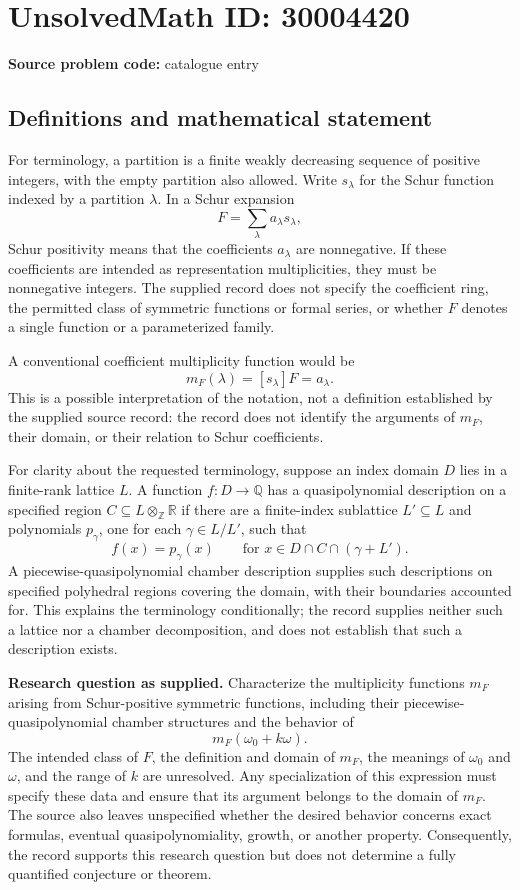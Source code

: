 \documentclass[11pt]{article}
\newcommand{\Z}{\mathbb{Z}}
\newcommand{\Q}{\mathbb{Q}}
\newcommand{\R}{\mathbb{R}}
\begin{document}
\section*{UnsolvedMath ID: 30004420}
\textbf{Source problem code:} catalogue entry
\subsection{Definitions and mathematical statement}
For terminology, a partition is a finite weakly decreasing sequence of positive integers, with the empty partition also allowed. Write \(s_\lambda\) for the Schur function indexed by a partition \(\lambda\). In a Schur expansion
\[
F=\sum_{\lambda}a_\lambda s_\lambda,
\]
Schur positivity means that the coefficients \(a_\lambda\) are nonnegative. If these coefficients are intended as representation multiplicities, they must be nonnegative integers. The supplied record does not specify the coefficient ring, the permitted class of symmetric functions or formal series, or whether \(F\) denotes a single function or a parameterized family.

A conventional coefficient multiplicity function would be
\[
m_F(\lambda)=[s_\lambda]F=a_\lambda.
\]
This is a possible interpretation of the notation, not a definition established by the supplied source record: the record does not identify the arguments of \(m_F\), their domain, or their relation to Schur coefficients.

For clarity about the requested terminology, suppose an index domain \(D\) lies in a finite-rank lattice \(L\). A function \(f:D\to\Q\) has a quasipolynomial description on a specified region \(C\subseteq L\otimes_{\Z}\R\) if there are a finite-index sublattice \(L'\subseteq L\) and polynomials \(p_\gamma\), one for each \(\gamma\in L/L'\), such that
\[
f(x)=p_\gamma(x)\qquad
\text{for }x\in D\cap C\cap(\gamma+L').
\]
A piecewise-quasipolynomial chamber description supplies such descriptions on specified polyhedral regions covering the domain, with their boundaries accounted for. This explains the terminology conditionally; the record supplies neither such a lattice nor a chamber decomposition, and does not establish that such a description exists.

\textbf{Research question as supplied.} Characterize the multiplicity functions \(m_F\) arising from Schur-positive symmetric functions, including their piecewise-quasipolynomial chamber structures and the behavior of
\[
m_F(\omega_0+k\omega).
\]
The intended class of \(F\), the definition and domain of \(m_F\), the meanings of \(\omega_0\) and \(\omega\), and the range of \(k\) are unresolved. Any specialization of this expression must specify these data and ensure that its argument belongs to the domain of \(m_F\). The source also leaves unspecified whether the desired behavior concerns exact formulas, eventual quasipolynomiality, growth, or another property. Consequently, the record supports this research question but does not determine a fully quantified conjecture or theorem.
\end{document}
